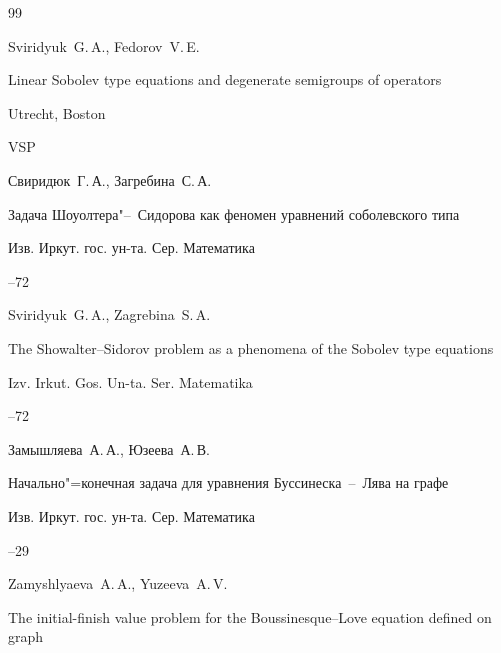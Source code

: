 \begin{thebibliography}{99}




\by Sviridyuk~G.\,A., Fedorov~V.\,E.

\book Linear Sobolev type equations and degenerate semigroups of operators

\publaddr Utrecht, Boston

\publ VSP






\by Свиридюк~Г.\,А., Загребина~С.\,А.

\paper Задача Шоуолтера"--~Сидорова как феномен уравнений соболевского типа

\jour Изв. Иркут. гос. ун-та. Сер. Математика




--72

\misctransl

\by Sviridyuk~G.\,A., Zagrebina~S.\,A.

\paper The Showalter--Sidorov problem as a phenomena of the Sobolev type equations

\jour Izv. Irkut. Gos. Un-ta. Ser. Matematika




--72




\by Замышляева~А.\,А., Юзеева~А.\,В.

\paper Начально"=конечная задача для уравнения Буссинеска~--~Лява на графе

\jour Изв. Иркут. гос. ун-та. Сер. Математика




--29

\misctransl

\by Zamyshlyaeva~A.\,A., Yuzeeva~A.\,V.

\paper The initial-finish value problem for the Boussinesque--Love equation defined on graph


\end{thebibliography}
